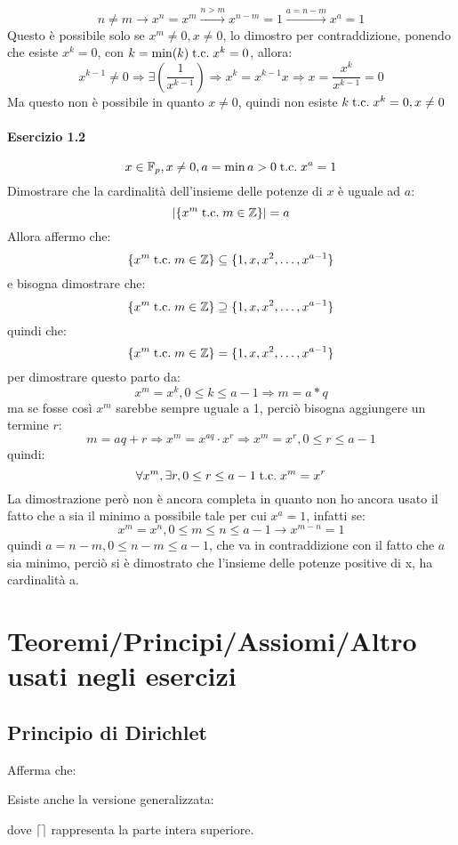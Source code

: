 \documentclass[a4paper,12pt]{article}
\begin{document}
	\[n \not = m \rightarrow x^n = x^m \xrightarrow{n > m} x^{n - m} = 1 \xrightarrow{a = n - m} x^a = 1\]
	Questo è possibile solo se $x^m \not = 0, x \not = 0$, lo dimostro per contraddizione, ponendo che esiste $x^k = 0$, con $k = \min(k) \;\text{t.c.}\; x^k = 0$, allora:
	\[x^{k - 1} \not = 0 \Rightarrow \exists (\frac{1}{x^{k-1}}) \Rightarrow x^k = x^{k - 1} x \Rightarrow x = \frac{x^k}{x^{k -1}} = 0\]
	Ma questo non è possibile in quanto $x \not = 0$, quindi non esiste $k \;\text{t.c.}\; x^k = 0, x \not = 0$
	
	\paragraph{Esercizio 1.2}
	\[x \in \mathbb{F}_p, x \not = 0, a = \min a > 0 \;\text{t.c.}\; x^a = 1\]
	Dimostrare che la cardinalità dell'insieme delle potenze di $x$ è uguale ad $a$:
	\[|\{x^m \;\text{t.c.}\; m \in \mathbb{Z}\}| = a\]
	Allora affermo che:
	\[\{x^m \;\text{t.c.}\; m \in \mathbb{Z}\} \subseteq \{1, x, x^2, \dots, x^{a-1}\}\]
	e bisogna dimostrare che:
	\[\{x^m \;\text{t.c.}\; m \in \mathbb{Z}\} \supseteq \{1, x, x^2, \dots, x^{a-1}\}\]
	quindi che:
	\[\{x^m \;\text{t.c.}\; m \in \mathbb{Z}\} = \{1, x, x^2, \dots, x^{a-1}\}\]
	per dimostrare questo parto da:
	\[x^m = x^k, 0\leq k \leq a -1 \Rightarrow m = a * q\]
	ma se fosse così $x^m$ sarebbe sempre uguale a 1, perciò bisogna aggiungere un termine $r$:
	\[m = aq + r \Rightarrow x^m = x^{aq} \cdot x^r \Rightarrow x^m = x^r, 0 \leq r \leq a - 1\]
	quindi:
	\[\forall x^m, \exists r, 0\leq r \leq a -1 \;\text{t.c.}\; x^m = x^r\]
	La dimostrazione però non è ancora completa in quanto non ho ancora usato il fatto che a sia il minimo a possibile tale per cui $x^a = 1$, infatti se:
	\[x^m = x^n, 0 \leq m \leq n \leq a -1 \rightarrow x^{m - n} = 1\]
	quindi $a = n - m, 0 \leq n - m \leq a - 1$, che va in contraddizione con il fatto che $a$ sia minimo, perciò si è dimostrato che l'insieme delle potenze positive di x, ha cardinalità a.
	
	
	
	\newpage
	
	\section{Teoremi/Principi/Assiomi/Altro usati negli esercizi}
	\subsection{Principio di Dirichlet}
	\label{sec: Dirichlet}
	Afferma che:
	\begin{center}
	\end{center}
	Esiste anche la versione generalizzata:
	\begin{center}
	\end{center}
	dove $\lceil \rceil$ rappresenta la parte intera superiore.
	
\end{document}
